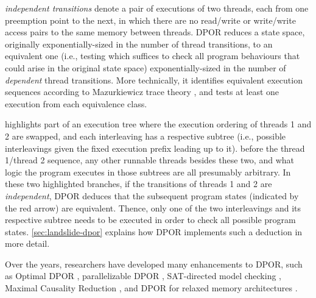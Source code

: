 {\em independent transitions} denote a pair of executions of two threads, each from one preemption point to the next,
in which there are no read/write or write/write access pairs to the same memory between threads.
DPOR reduces a state space, originally exponentially-sized in the number of thread transitions,
to an equivalent one
(i.e., testing which suffices to check all program behaviours that could arise in the original state space)
exponentially-sized in the number of {\em dependent} thread transitions.
More technically, it identifies equivalent execution sequences according to Mazurkiewicz trace theory \cite{mazurkiewicz},
and tests at least one execution from each equivalence class.

highlights part of an execution tree where the execution ordering of threads 1 and 2 are swapped,
and each interleaving has a respective subtree (i.e., possible interleavings given the fixed execution prefix leading up to it).
before the thread 1/thread 2 sequence,
any other runnable threads besides these two, %
and what logic the program executes in those subtrees
are all presumably arbitrary.
In these two highlighted branches,
if the transitions of threads 1 and 2 are {\em independent},
DPOR deduces that the subsequent program states (indicated by the red arrow) are equivalent.
Thence, only one of the two interleavings and its respective subtree needs to be executed
in order to check all possible program states.
\cref{sec:landslide-dpor} explains how DPOR implements such a deduction in more detail.

Over the years, researchers have developed many enhancements to DPOR, such as Optimal DPOR \cite{optimal-dpor}, parallelizable DPOR \cite{parallel-dpor}, SAT-directed model checking \cite{satcheck}, Maximal Causality Reduction \cite{mcr}, and DPOR for relaxed memory architectures \cite{tsopso}.

